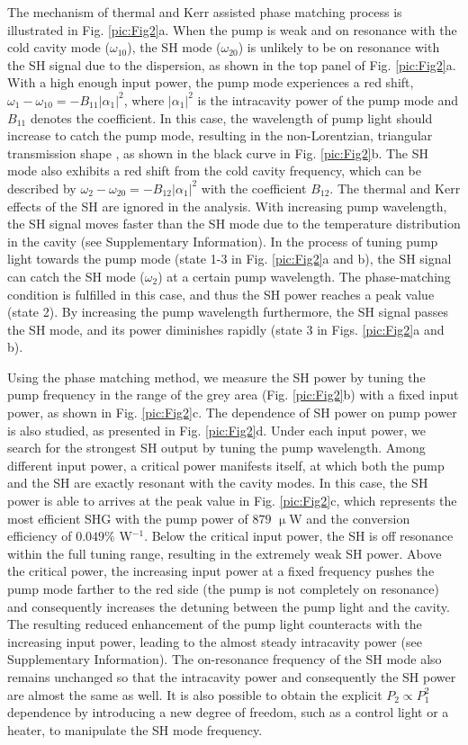 \documentclass[a4paper,8pt,hyperref, twocolumn, aps, prl]{article}
\begin{document}
The mechanism of thermal and Kerr assisted phase matching process is illustrated in Fig. \ref{pic:Fig2}a. 
When the pump is weak and on resonance with the cold cavity mode ($\omega_{10}$), the SH mode ($\omega_{20}$) is unlikely to be on resonance with the SH signal due to the dispersion, as shown in the top panel of Fig. \ref{pic:Fig2}a. 
With a high enough input power, the pump mode experiences a red shift, $\omega_1-\omega_{10} = -B_{11}|\alpha_1|^2$, where $|\alpha_1|^2$ is the intracavity power of the pump mode and $B_{11}$ denotes the coefficient. 
In this case, the wavelength of pump light should increase to catch the pump mode, resulting in the non-Lorentzian, triangular transmission shape \cite{carmon2004dynamical}, as shown in the black curve in Fig. \ref{pic:Fig2}b.
The SH mode also exhibits a red shift from the cold cavity frequency, which can be described by $\omega_2-\omega_{20} = -B_{12}|\alpha_1|^2$ with the coefficient $B_{12}$. 
The thermal and Kerr effects of the SH are ignored in the analysis.
With increasing pump wavelength, the SH signal moves faster than the SH mode due to the temperature distribution in the cavity (see Supplementary Information).
In the process of tuning pump light towards the pump mode (state 1-3 in Fig. \ref{pic:Fig2}a and b), the SH signal can catch the SH mode ($\omega_2$) at a certain pump wavelength. 
The phase-matching condition is fulfilled in this case, and thus the SH power reaches a peak value (state 2).
By increasing the pump wavelength furthermore, the SH signal passes the SH mode, and its power diminishes rapidly (state 3 in Figs. \ref{pic:Fig2}a and b). 


Using the phase matching method, we measure the SH power by tuning the pump frequency in the range of the grey area (Fig. \ref{pic:Fig2}b) with a fixed input power, as shown in Fig. \ref{pic:Fig2}c. 
The dependence of SH power on pump power is also studied, as presented in Fig. \ref{pic:Fig2}d. 
Under each input power, we search for the strongest SH output by tuning the pump wavelength. 
Among different input power, a critical power manifests itself, at which both the pump and the SH are exactly resonant with the cavity modes. 
In this case, the SH power is able to arrives at the peak value in Fig. \ref{pic:Fig2}c, which represents the most efficient SHG with the pump power of $879$ $\upmu$W and the conversion efficiency of $0.049\%$ W$^{-1}$.
Below the critical input power, the SH is off resonance within the full tuning range, resulting in the extremely weak SH power.
Above the critical power, the increasing input power at a fixed frequency pushes the pump mode farther to the red side (the pump is not completely on resonance) and consequently increases the detuning between the pump light and the cavity.
The resulting reduced enhancement of the pump light counteracts with the increasing input power, leading to the almost steady intracavity power (see Supplementary Information). 
The on-resonance frequency of the SH mode also remains unchanged so that the intracavity power and consequently the SH power are almost the same as well.
It is also possible to obtain the explicit $P_2 \propto P_1^2$ dependence by introducing a new degree of freedom, such as a control light or a heater, to manipulate the SH mode frequency. 
\end{document}
